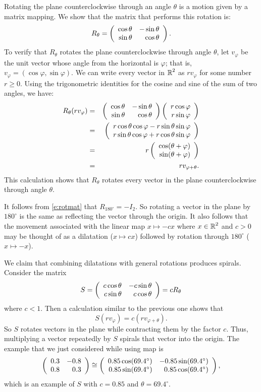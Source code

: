 \documentclass{ximera}
\begin{document}
Rotating the plane counterclockwise through an angle $\theta$ is
a motion given by a matrix mapping.  We show that the matrix that
performs this rotation is:
\begin{equation} \label{e:rotmat}
R_\theta = \left(\begin{array}{rr} \cos\theta & -\sin\theta\\ \sin\theta &\cos\theta\end{array}\right).
\end{equation}
To verify that $R_\theta$ rotates the plane counterclockwise
through angle $\theta$, let $v_\varphi$ be the unit vector whose
angle from the horizontal is $\varphi$; that is,
$v_\varphi=(\cos\varphi,\sin\varphi)$.  We can write every vector in
$\mbox{$\Bbb{R}$}^2$ as $rv_\varphi$ for some number $r\ge 0$.   Using the 
trigonometric identities for the cosine and sine of the sum of two angles, we
have:
\begin{eqnarray*}
R_\theta (rv_\varphi) & = &
\left(\begin{array}{rr} \cos\theta & -\sin\theta\\ \sin\theta &\cos\theta\end{array}\right)
\left(\begin{array}{r} r\cos\varphi \\ r\sin\varphi\end{array}\right) \\
& = & \left(\begin{array}{r} r\cos\theta\cos\varphi -r\sin\theta\sin\varphi \\ r\sin\theta\cos\varphi + r\cos\theta\sin\varphi\end{array}\right)\\
& = & r\left(\begin{array}{r} \cos(\theta+\varphi) \\ \sin(\theta+\varphi)\end{array}\right)  \\
& = & rv_{\varphi+\theta}.
\end{eqnarray*}
This calculation shows that $R_\theta$ rotates every vector in the plane
counterclockwise through angle $\theta$.

It follows from \eqref{e:rotmat} that $R_{180^\circ} = -I_2$.  So rotating a
vector in the plane by $180^\circ$ is the same as reflecting the vector
through the origin.  It also follows that the movement associated with the
linear map $x\mapsto -cx$ where $x\in\mbox{$\Bbb{R}$}^2$ and $c>0$ may be thought of as a dilatation
($x\mapsto cx$) followed by rotation through $180^\circ$ ($x\mapsto -x$).

We claim that combining dilatations with general rotations produces spirals.  
Consider the matrix
\[
S = \left(\begin{array}{rr} c\cos\theta & -c\sin\theta\\ c\sin\theta &c\cos\theta\end{array}\right) = cR_\theta
\]
where $c<1$.  Then a calculation similar to the previous one shows that
\[
S(rv_\varphi) = c(rv_{\varphi+\theta}).
\]
So $S$ rotates vectors in the plane while contracting them by
the factor $c$.  Thus, multiplying a vector repeatedly by $S$ 
spirals that vector into the origin.  The example that we just 
considered while using {\sf map} is
\[
\left(\begin{array}{rr} 0.3 & -0.8\\ 0.8 &0.3\end{array}\right)\cong\left(\begin{array}{rr} 0.85\cos(69.4^\circ) & -0.85\sin(69.4^\circ)\\ 0.85\sin(69.4^\circ) &0.85\cos(69.4^\circ)\end{array}\right),
\]
which is an example of $S$ with $c = 0.85$ and $\theta = 69.4^\circ$.
\end{document}
